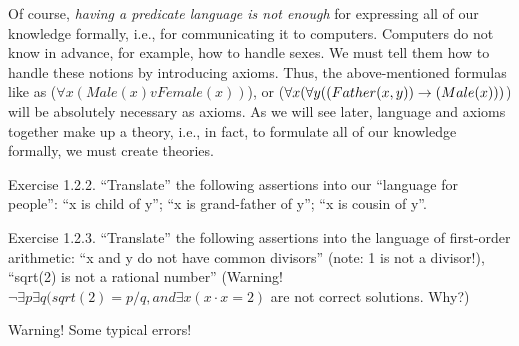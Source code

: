 Of course, \emph{having a predicate language is not enough} for expressing all of our knowledge formally, i.e., for communicating it to computers.
Computers do not know in advance, for example, how to handle sexes.
We must tell them how to handle these notions by introducing axioms. Thus, the above-mentioned formulas like as (\(\forall x(Male(x) v Female(x))\)), or (\(\forall x(\forall y((Father(x, y))\rightarrow (Male(x)))\)) will be absolutely necessary as axioms.
As we will see later, language and axioms together make up a theory, i.e., in fact, to formulate all of our knowledge formally, we must create theories.
\begin{exercise}
Exercise 1.2.2. ``Translate'' the following assertions into our ``language for people'':
``x is child of y'';
``x is grand-father of y'';
``x is cousin of y''.
\end{exercise}

\begin{exercise}
Exercise 1.2.3. ``Translate'' the following assertions into the language of first-order arithmetic:
``x and y do not have common divisors'' (note: 1 is not a divisor!),
``sqrt(2) is not a rational number''
(Warning! \(\neg \exists p\exists q(sqrt(2)=p/q, and \exists x(x\cdot x=2)\) are not correct solutions. Why?)
\end{exercise}

Warning! Some typical errors!

